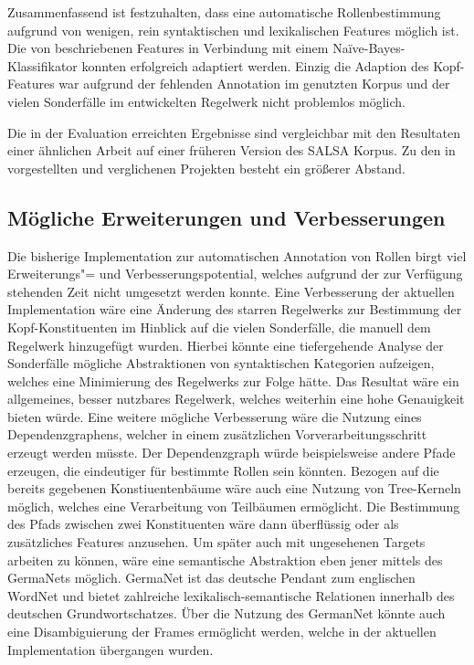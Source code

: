 \documentclass[12pt]{article}
\begin{document}
Zusammenfassend ist festzuhalten, dass eine automatische Rollenbestimmung
aufgrund von wenigen, rein syntaktischen und lexikalischen Features möglich ist.
Die von \cite{gildea} beschriebenen Features in Verbindung mit einem Naïve-Bayes-Klassifikator konnten erfolgreich adaptiert werden. Einzig die Adaption des Kopf-Features war aufgrund der fehlenden Annotation im genutzten Korpus und der vielen Sonderfälle im entwickelten Regelwerk nicht problemlos möglich.

Die in der Evaluation erreichten Ergebnisse sind vergleichbar mit den Resultaten
einer ähnlichen Arbeit auf einer früheren Version des SALSA Korpus. Zu den in
\cite{hajivc2009conll} vorgestellten und verglichenen Projekten besteht ein
größerer Abstand.


\subsection{Mögliche Erweiterungen und Verbesserungen}

Die bisherige Implementation zur automatischen Annotation von Rollen birgt viel Erweiterungs"= und Verbesserungspotential, welches aufgrund der zur Verfügung stehenden Zeit nicht umgesetzt werden konnte.
Eine Verbesserung der aktuellen Implementation wäre eine Änderung des starren Regelwerks zur Bestimmung der Kopf-Konstituenten im Hinblick auf die vielen Sonderfälle, die manuell dem Regelwerk hinzugefügt wurden. Hierbei könnte eine tiefergehende Analyse der Sonderfälle mögliche Abstraktionen von syntaktischen Kategorien aufzeigen, welches eine Minimierung des Regelwerks zur Folge hätte. Das Resultat wäre ein allgemeines, besser nutzbares Regelwerk, welches weiterhin eine hohe Genauigkeit bieten würde.
Eine weitere mögliche Verbesserung wäre die Nutzung eines Dependenzgraphens, welcher in einem zusätzlichen Vorverarbeitungsschritt erzeugt werden müsste. Der Dependenzgraph würde beispielsweise andere Pfade erzeugen, die eindeutiger für bestimmte Rollen sein könnten. 
Bezogen auf die bereits gegebenen Konstiuentenbäume wäre auch eine Nutzung von Tree-Kerneln möglich, welches eine Verarbeitung von Teilbäumen ermöglicht. Die Bestimmung des Pfads zwischen zwei Konstituenten wäre dann überflüssig oder als zusätzliches Features anzusehen.
Um später auch mit ungesehenen Targets arbeiten zu können, wäre eine semantische Abstraktion eben jener mittels des GermaNets möglich. GermaNet\citep{Hamp97germanet} ist das deutsche Pendant zum englischen WordNet\citep{Miller1990} und bietet zahlreiche lexikalisch-semantische Relationen innerhalb des deutschen Grundwortschatzes. Über die Nutzung des GermanNet könnte auch eine Disambiguierung der Frames ermöglicht werden, welche in der aktuellen Implementation übergangen wurden.
 
\newpage


\end{document}
